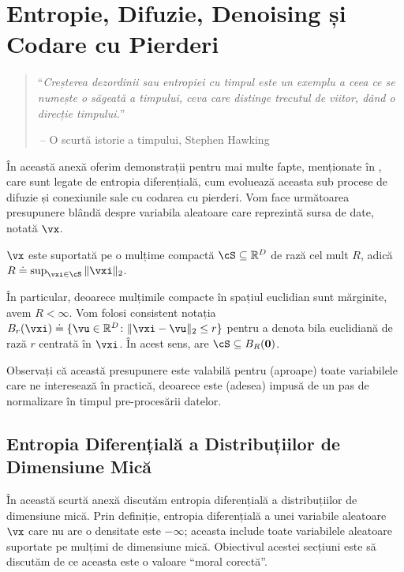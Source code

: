 \documentclass[../../book-main_ro.tex]{subfiles}
\begin{document}
\chapter{Entropie, Difuzie, Denoising și Codare cu Pierderi}\label{app:entropy}\label{app:diffusion-denoising}

\begin{quote}
``{\em Creșterea dezordinii sau entropiei cu timpul este un exemplu a ceea ce se numește o săgeată a timpului, ceva care distinge trecutul de viitor, dând o direcție timpului.}''

$~$\hfill -- O scurtă istorie a timpului, Stephen Hawking
 \end{quote}
\vspace{5mm}

În această anexă oferim demonstrații pentru mai multe fapte, menționate în
, care sunt legate de entropia diferențială, cum
evoluează aceasta sub procese de difuzie și conexiunile sale cu codarea cu pierderi. Vom
face următoarea presupunere blândă despre variabila aleatoare care reprezintă
sursa de date, notată \(\vx\).

\begin{assumption}\label{assumption:entropy_x_compact_support}
    \(\vx\) este suportată pe o mulțime compactă \(\cS \subseteq \R^{D}\) de rază cel mult \(R\), adică \(R \doteq \sup_{\vxi \in \cS}\norm{\vxi}_{2}\).
\end{assumption}

În particular, deoarece mulțimile compacte în spațiul euclidian sunt mărginite, avem \(R < \infty\). Vom folosi consistent notația \(B_{r}(\vxi) \doteq \{\vu \in \R^{D} \colon \norm{\vxi - \vu}_{2} \leq r\}\) pentru a denota bila euclidiană de rază \(r\) centrată în \(\vxi\). În acest sens,  are \(\cS \subseteq B_{R}(\vzero)\).

Observați că această presupunere este valabilă pentru (aproape) toate variabilele care ne interesează în practică, deoarece este (adesea) impusă de un pas de normalizare în timpul pre-procesării datelor. 

\section{Entropia Diferențială a Distribuțiilor de Dimensiune Mică}\label{sec:low_dim_entropy}

În această scurtă anexă discutăm entropia diferențială a distribuțiilor de dimensiune mică. Prin definiție, entropia diferențială a unei variabile aleatoare \(\vx\) care nu are o densitate este \(-\infty\); aceasta include toate variabilele aleatoare suportate pe mulțimi de dimensiune mică. Obiectivul acestei secțiuni este să discutăm de ce aceasta este o valoare ``moral corectă''.
\end{document}
